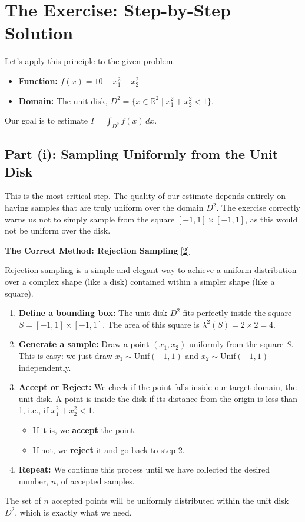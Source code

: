 \documentclass[11pt,a4paper]{article}
\newcommand{\conceptnote}[2]{%
    \hyperlink{#1}{\color{blue!70!black}[#2]}%
}
\begin{document}
\section{The Exercise: Step-by-Step Solution}

Let's apply this principle to the given problem.
\begin{itemize}
    \item \textbf{Function:} $f(x) = 10 - x_1^2 - x_2^2$
    \item \textbf{Domain:} The unit disk, $D^2 = \{x \in \mathbb{R}^2 \mid x_1^2 + x_2^2 < 1\}$.
\end{itemize}
Our goal is to estimate $I = \int_{D^2} f(x) \,dx$.

\subsection{Part (i): Sampling Uniformly from the Unit Disk}

This is the most critical step. The quality of our estimate depends entirely on having samples that are truly uniform over the domain $D^2$. The exercise correctly warns us not to simply sample from the square $[-1, 1] \times [-1, 1]$, as this would not be uniform over the disk.

\textbf{The Correct Method: Rejection Sampling}\conceptnote{rejection}{2}

Rejection sampling is a simple and elegant way to achieve a uniform distribution over a complex shape (like a disk) contained within a simpler shape (like a square).

\begin{enumerate}
    \item \textbf{Define a bounding box:} The unit disk $D^2$ fits perfectly inside the square $S = [-1, 1] \times [-1, 1]$. The area of this square is $\lambda^2(S) = 2 \times 2 = 4$.
    \item \textbf{Generate a sample:} Draw a point $(x_1, x_2)$ uniformly from the square $S$. This is easy: we just draw $x_1 \sim \text{Unif}(-1, 1)$ and $x_2 \sim \text{Unif}(-1, 1)$ independently.
    \item \textbf{Accept or Reject:} We check if the point falls inside our target domain, the unit disk. A point is inside the disk if its distance from the origin is less than 1, i.e., if $x_1^2 + x_2^2 < 1$.
    \begin{itemize}
        \item If it is, we \textbf{accept} the point.
        \item If not, we \textbf{reject} it and go back to step 2.
    \end{itemize}
    \item \textbf{Repeat:} We continue this process until we have collected the desired number, $n$, of accepted samples.
\end{enumerate}
The set of $n$ accepted points will be uniformly distributed within the unit disk $D^2$, which is exactly what we need.
\end{document}
